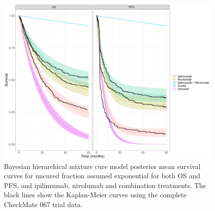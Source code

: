 \documentclass[AMA,STIX1COL]{WileyNJD-v2}
\begin{document}

\begin{figure}[!ht]
\centering
\includegraphics[width=0.7\linewidth]{bmcm_stan_exp_exp_S_plot.png}
\caption{\label{fig:S_exp_cf_hier} Bayesian hierarchical mixture cure model posterior mean survival curves for uncured fraction assumed exponential for both OS and PFS, and ipilimumab, nivolumab and combination treatments. The black lines show the Kaplan-Meier curves using the complete CheckMate 067 trial data.}
\end{figure}
\end{document}
